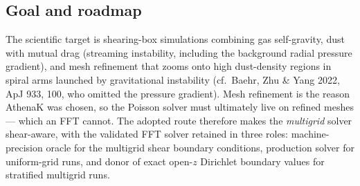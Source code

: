 \documentclass[11pt]{article}
\begin{document}
\subsection{Goal and roadmap}
The scientific target is shearing-box simulations combining gas self-gravity, dust with
mutual drag (streaming instability, including the background radial pressure gradient),
and mesh refinement that zooms onto high dust-density regions in spiral arms launched
by gravitational instability (cf.\ Baehr, Zhu \& Yang 2022, ApJ 933, 100, who omitted
the pressure gradient). Mesh refinement is the reason AthenaK was chosen, so the
Poisson solver must ultimately live on refined meshes --- which an FFT cannot. The
adopted route therefore makes the \emph{multigrid} solver shear-aware, with the
validated FFT solver retained in three roles: machine-precision oracle for the
multigrid shear boundary conditions, production solver for uniform-grid runs, and
donor of exact open-$z$ Dirichlet boundary values for stratified multigrid runs.
\end{document}

